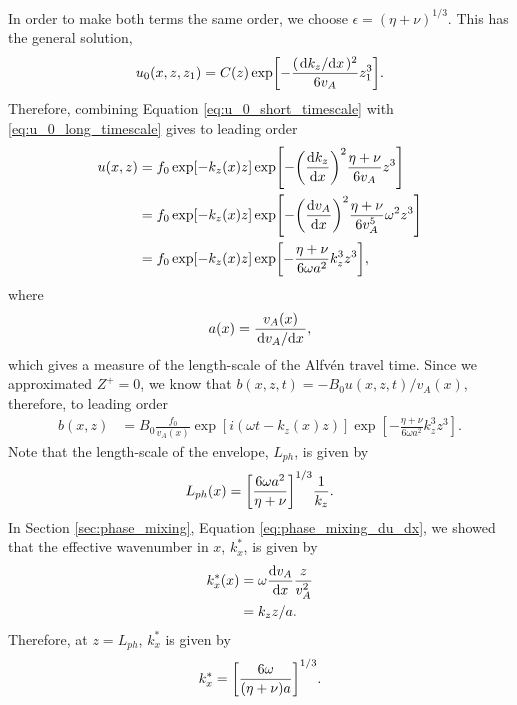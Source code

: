In order to make both terms the same order, we choose $\epsilon = (\eta+\nu)^{1/3}$. This has the general solution,
\begin{equation}
    \label{eq:u_0_long_timescale}
    u_0(x,z,z_1) = C(z)\exp[-\frac{(\dv*{k_z}{x})^2}{6v_A}z_1^3].
\end{equation}
Therefore, combining Equation \eqref{eq:u_0_short_timescale} with \eqref{eq:u_0_long_timescale} gives to leading order
\begin{equation}
    \label{eq:leading_order_phase_mixed_soln}
    \begin{aligned}
    u(x,z) &= f_0\exp[-k_z(x)z]\exp[-\qty(\dv{k_z}{x})^2\frac{\eta+\nu}{6v_A}z^3] \\
    &= f_0\exp[-k_z(x)z]\exp[-\qty(\dv{v_A}{x})^2\frac{\eta+\nu}{6v_A^5}\omega^2 z^3] \\
    &= f_0\exp[-k_z(x)z]\exp[-\frac{\eta+\nu}{6\omega a^2}k_z^3 z^3], \\
    \end{aligned}
\end{equation}
where 
\begin{equation}
    \label{eq:length_scale_alfven_travel_time}
    a(x) = \frac{v_A(x)}{\dv*{v_A}{x}},
\end{equation}
which gives a measure of the length-scale of the Alfv\'en travel time.
Since we approximated $Z^{+}=0$, we know that $b(x,z,t) = -B_0 u(x,z,t) / v_A(x)$, therefore, to leading order
\begin{equation}
    \label{eq:leading_order_phase_mixed_soln_b}
    \begin{aligned}
    b(x,z) &= B_0\frac{f_0}{v_A(x)}\exp[i(\omega t-k_z(x)z)]\exp[-\frac{\eta+\nu}{6\omega a^2}k_z^3 z^3].
    \end{aligned}
\end{equation}
Note that the length-scale of the envelope, $L_{ph}$, is given by
\begin{equation}
    \label{eq:phase_mixed_z_length_scale}
    L_{ph}(x) = \qty[\frac{6\omega a^2}{\eta+\nu}]^{1/3}\frac{1}{k_z}.
\end{equation}
In Section \ref{sec:phase_mixing}, Equation \eqref{eq:phase_mixing_du_dx}, we showed that the effective wavenumber in $x$, $k_x^*$, is given by
\begin{equation}
    \label{eq:kx_star}
    \begin{aligned}
    k_x^*(x) &= \omega \dv{v_A}{x}\frac{z}{v_A^2} \\
    &=k_z z / a.
    \end{aligned}
\end{equation}
Therefore, at $z=L_{ph}$, $k_x^*$ is given by
\begin{equation}
    \label{eq:phase_mixed_x_length_scale}
    k_x^*= \qty[\frac{6\omega }{(\eta+\nu)a}]^{1/3}.
\end{equation}

